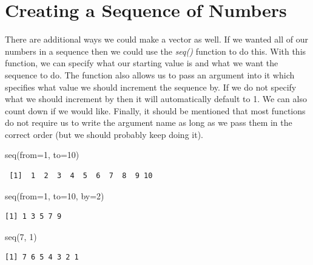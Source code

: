 \documentclass[
  letterpaper,
  DIV=11,
  numbers=noendperiod]{scrreprt}
\newenvironment{Shaded}{\begin{snugshade}}{\end{snugshade}}
\newcommand{\AttributeTok}[1]{\textcolor[rgb]{0.40,0.45,0.13}{#1}}
\newcommand{\DecValTok}[1]{\textcolor[rgb]{0.68,0.00,0.00}{#1}}
\newcommand{\FunctionTok}[1]{\textcolor[rgb]{0.28,0.35,0.67}{#1}}
\newcommand{\NormalTok}[1]{\textcolor[rgb]{0.00,0.23,0.31}{#1}}
\begin{document}
\section{Creating a Sequence of
Numbers}\label{creating-a-sequence-of-numbers}

There are additional ways we could make a vector as well. If we wanted
all of our numbers in a sequence then we could use the \emph{seq()}
function to do this. With this function, we can specify what our
starting value is and what we want the sequence to do. The function also
allows us to pass an argument into it which specifies what value we
should increment the sequence by. If we do not specify what we should
increment by then it will automatically default to 1. We can also count
down if we would like. Finally, it should be mentioned that most
functions do not require us to write the argument name as long as we
pass them in the correct order (but we should probably keep doing it).

\begin{Shaded}
\begin{Highlighting}[]
\FunctionTok{seq}\NormalTok{(}\AttributeTok{from=}\DecValTok{1}\NormalTok{, }\AttributeTok{to=}\DecValTok{10}\NormalTok{)}
\end{Highlighting}
\end{Shaded}

\begin{verbatim}
 [1]  1  2  3  4  5  6  7  8  9 10
\end{verbatim}

\begin{Shaded}
\begin{Highlighting}[]
\FunctionTok{seq}\NormalTok{(}\AttributeTok{from=}\DecValTok{1}\NormalTok{, }\AttributeTok{to=}\DecValTok{10}\NormalTok{, }\AttributeTok{by=}\DecValTok{2}\NormalTok{)}
\end{Highlighting}
\end{Shaded}

\begin{verbatim}
[1] 1 3 5 7 9
\end{verbatim}

\begin{Shaded}
\begin{Highlighting}[]
\FunctionTok{seq}\NormalTok{(}\DecValTok{7}\NormalTok{, }\DecValTok{1}\NormalTok{)}
\end{Highlighting}
\end{Shaded}

\begin{verbatim}
[1] 7 6 5 4 3 2 1
\end{verbatim}
\end{document}

